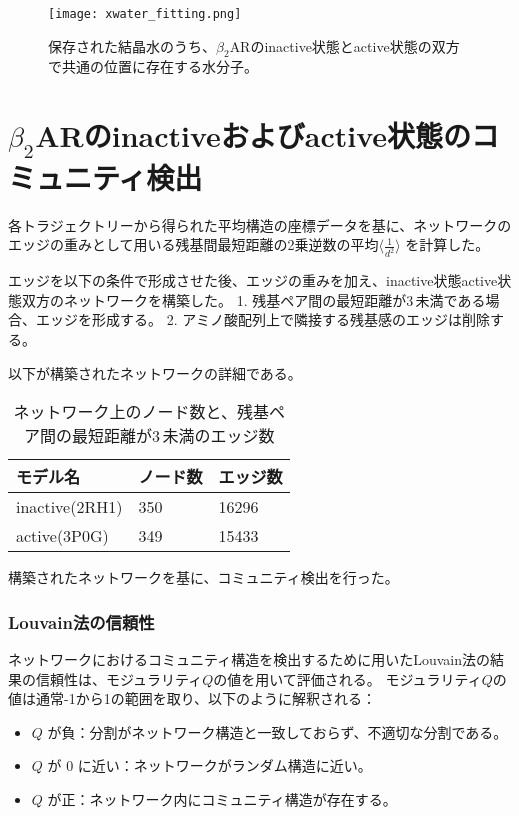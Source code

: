 \begin{figure}[htbp]
  \centering
  \texttt{[image: xwater\_fitting.png]}
  \caption{保存された結晶水のうち、$\beta_2$ARのinactive状態とactive状態の双方で共通の位置に存在する水分子。}
  \label{fig:xwater_fitting}
\end{figure}

\newpage


\section{$\beta_2$ARのinactiveおよびactive状態のコミュニティ検出}

各トラジェクトリーから得られた平均構造の座標データを基に、ネットワークのエッジの重みとして用いる残基間最短距離の2乗逆数の平均$\langle \frac{1}{d^2} \rangle$ を計算した。

エッジを以下の条件で形成させた後、エッジの重みを加え、inactive状態active状態双方のネットワークを構築した。
1. 残基ペア間の最短距離が3\,\text{\AA}未満である場合、エッジを形成する。
2. アミノ酸配列上で隣接する残基感のエッジは削除する。

以下が構築されたネットワークの詳細である。
\begin{table}[!ht]
    \centering
    \caption{ネットワーク上のノード数と、残基ペア間の最短距離が3\,\text{\AA}未満のエッジ数}
    \begin{tabular}{lll}
      \hline
      モデル名          & ノード数  & エッジ数 \\
      \hline 
      inactive(2RH1)  &  350 &  16296 \\ 
      active(3P0G)    &  349 &  15433 \\ 
    \end{tabular}
    \label{tab:network_size}
  \end{table}

構築されたネットワークを基に、コミュニティ検出を行った。
\subsubsection{Louvain法の信頼性}

ネットワークにおけるコミュニティ構造を検出するために用いたLouvain法の結果の信頼性は、モジュラリティ$Q$の値を用いて評価される。
モジュラリティ$Q$の値は通常-1から1の範囲を取り、以下のように解釈される：

\begin{itemize}
    \item \( Q \) が負：分割がネットワーク構造と一致しておらず、不適切な分割である。
    \item \( Q \) が 0 に近い：ネットワークがランダム構造に近い。
    \item \( Q \) が正：ネットワーク内にコミュニティ構造が存在する。
\end{itemize}

